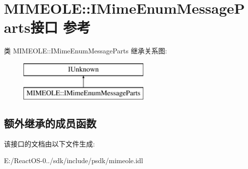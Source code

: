\hypertarget{interface_m_i_m_e_o_l_e_1_1_i_mime_enum_message_parts}{}\section{M\+I\+M\+E\+O\+LE\+:\+:I\+Mime\+Enum\+Message\+Parts接口 参考}
\label{interface_m_i_m_e_o_l_e_1_1_i_mime_enum_message_parts}
类 M\+I\+M\+E\+O\+LE\+:\+:I\+Mime\+Enum\+Message\+Parts 继承关系图\+:\begin{figure}[H]
\begin{center}
\leavevmode
\includegraphics[height=2.000000cm]{interface_m_i_m_e_o_l_e_1_1_i_mime_enum_message_parts}
\end{center}
\end{figure}
\subsection*{额外继承的成员函数}


该接口的文档由以下文件生成\+:\begin{DoxyCompactItemize}
\item 
E\+:/\+React\+O\+S-\/0../sdk/include/psdk/mimeole.\+idl\end{DoxyCompactItemize}
